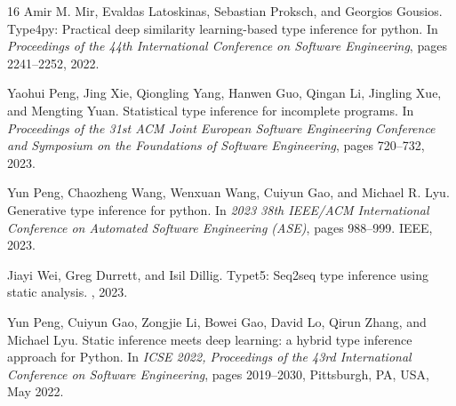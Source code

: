 \documentclass[acmsmall,screen,review,anonymous]{acmart}
\begin{document}
\begin{thebibliography}{16}
Amir M. Mir, Evaldas Latoskinas, Sebastian Proksch, and Georgios Gousios.
\newblock Type4py: Practical deep similarity learning-based type inference for python.
\newblock In {\em Proceedings of the 44th International Conference on Software Engineering}, pages 2241--2252, 2022.

Yaohui Peng, Jing Xie, Qiongling Yang, Hanwen Guo, Qingan Li, Jingling Xue, and Mengting Yuan.
\newblock Statistical type inference for incomplete programs.
\newblock In {\em Proceedings of the 31st ACM Joint European Software Engineering Conference and Symposium on the Foundations of Software Engineering}, pages 720--732, 2023.

Yun Peng, Chaozheng Wang, Wenxuan Wang, Cuiyun Gao, and Michael R. Lyu.
\newblock Generative type inference for python.
\newblock In {\em 2023 38th IEEE/ACM International Conference on Automated Software Engineering (ASE)}, pages 988--999. IEEE, 2023.

Jiayi Wei, Greg Durrett, and Isil Dillig.
\newblock Typet5: Seq2seq type inference using static analysis.
, 2023.

Yun Peng, Cuiyun Gao, Zongjie Li, Bowei Gao, David Lo, Qirun Zhang, and Michael Lyu.
\newblock Static inference meets deep learning: a hybrid type inference approach for Python.
\newblock In {\em ICSE 2022, Proceedings of the 43rd International Conference on Software Engineering}, pages 2019--2030, Pittsburgh, PA, USA, May 2022.

\end{thebibliography}
\end{document}

